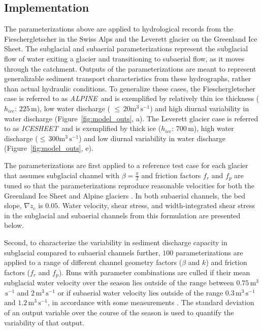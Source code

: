 \documentclass[11pt]{article}
\newcommand{\alpine}{\textit{ALPINE}\,}
\newcommand{\icesheet}{\textit{ICESHEET}\,}
\newcommand{\unit}[1]{$\mathrm{#1}$}
\begin{document}
\subsection{Implementation}
\label{sect:imp}

The parameterizations above are applied to hydrological records from the Fieschergletscher in the Swiss Alps and the Leverett glacier on the Greenland Ice Sheet.
The subglacial and subaerial parameterizations represent the subglacial flow of water exiting a glacier and transitioning to subaerial flow, as it moves through the catchment.
Outputs of the parameterizations are meant to represent generalizable sediment transport characteristics from these hydrographs, rather than actual hydraulic conditions.
To generalize these cases, the Fieschergletscher case is referred to as \alpine{} and is exemplified by relatively thin ice thickness ($h_{ice}$: $225$\,\unit{m}), low water discharge ( $\le\,20$\unit{m}$^3$\,\unit{s}$^{-1}$) and high diurnal variability in water discharge (Figure~\ref{fig:model_outs}, a).
The Leverett glacier case is referred to as \icesheet{} and is exemplified by thick ice  ($h_{ice}$: $700$\,\unit{m}), high water discharge ($\le\,300$\unit{m}$^3$\,\unit{s}$^{-1}$)  and low diurnal variability in water discharge (Figure~\ref{fig:model_outs}, e).

The parameterizations are first applied to a reference test case for each glacier that assumes  subglacial channel with $\beta=\frac{\pi}{2}$ and friction factors $f_r$ and $f_p$ are tuned so that the parameterizations reproduce reasonable velocities for both  the Greenland Ice Sheet and Alpine glaciers \citep[$\sim\,1.6\,$\unit{m}$^3$\,\unit{s}$^{-1}$][]{werder2010b,chandler2013}.
In both subaerial channels, the bed slope, $\nabla z_c$ is $0.05$.
Water velocity, shear stress, and width-integrated shear stress in the subglacial and subaerial channels from this formulation are presented below.  

Second, to characterize the variability in sediment discharge capacity in subglacial compared to subaerial channels further, $100$  parameterizations are applied to a range of different channel geometry factors ($\beta$ and $k$) and friction factors ($f_r$ and $f_p$).
Runs with parameter combinations  are culled if their mean subglacial water velocity over the season lies outside of the range between $0.75$\,\unit{m}$^3$\,\unit{s}$^{-1}$ and $2$\,\unit{m}$^3$\,\unit{s}$^{-1}$ or if subaerial water velocity lies outside of the range $0.3$\,\unit{m}$^3$\,\unit{s}$^{-1}$ and $1.2$\,\unit{m}$^3$\,\unit{s}$^{-1}$, in accordance with some measurements \citep[e.g.]{werder2010b,magnusson2012,chandler2013}.
The standard deviation of an output variable over the course of the season is used to quantify the variability of that output.
\end{document}

